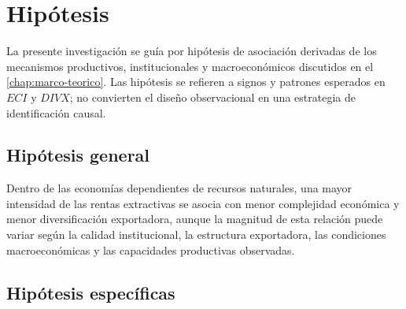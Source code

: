 \documentclass[../../TFM.tex]{subfiles}
\begin{document}
	\chapter{Hipótesis}

	\label{chap:hipotesis}




	La presente investigación se guía por hipótesis de asociación derivadas de los
	mecanismos productivos, institucionales y macroeconómicos discutidos en el
	\autoref{chap:marco-teorico}. Las hipótesis se refieren a signos y patrones
	esperados en $ECI$ y $DIVX$; no convierten el diseño observacional en una
	estrategia de identificación causal.






	\section{Hipótesis general}

	\label{sec:hipotesis-general}



	Dentro de las economías dependientes de recursos naturales, una mayor
	intensidad de las rentas extractivas se asocia con menor complejidad económica
	y menor diversificación exportadora, aunque la magnitud de esta relación puede
	variar según la calidad institucional, la estructura exportadora, las
	condiciones macroeconómicas y las capacidades productivas observadas.


	\section{Hipótesis específicas}
	\label{sec:hipotesis-especificas}
\end{document}
